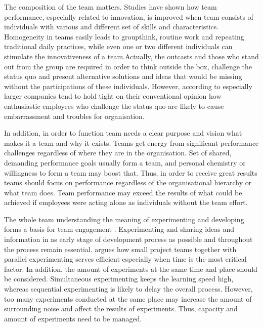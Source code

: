 The composition of the team matters. Studies have shown how team performance, especially related to innovation, is improved when team consists of individuals with various and different set of skills and characteristics\citep{buijs2007innovation}. Homogeneity in teams easily leads to groupthink, routine work and repeating traditional daily practices, while even one or two different individuals can stimulate the innovativeness of a team.Actually, the outcasts and those who stand out from the group are required in order to think outside the box, challenge the status quo and present alternative solutions and ideas that would be missing without the participations of these individuals. \citep{sternberg1997creativity} However, according to \citet{quinn1985managing} especially larger companies tend to hold tight on their conventional opinion how enthusiastic employees who challenge the status quo are likely to cause embarrassment and troubles for organisation.

In addition, in order to function team needs a clear purpose and vision what makes it a team and why it exists. Teams get energy from significant performance challenges regardless of where they are in the organisation. Set of shared, demanding performance goals usually form a team, and personal chemistry or willingness to form a team may boost that. Thus, in order to receive great results teams should focus on performance regardless of the organisational hierarchy or what team does. Team performance may exceed the results of what could be achieved if employees were acting alone as individuals without the team effort. \citep{katzenbach1993wisdom}

The whole team understanding the meaning of experimenting and developing forms a basis for team engagement . Experimenting and sharing ideas and information in as early stage of development process as possible and throughout the process remain essential. \citep{thomke2001enlightened} \citet{thomke2001enlightened} argues how small project teams together with parallel experimenting serves efficient especially when time is the most critical factor. In addition, the amount of experiments at the same time and place should be considered. Simultaneous experimenting keeps the learning speed high, whereas sequential experimenting is likely to delay the overall process. However, too many experiments conducted at the same place may increase the amount of surrounding noise and affect the results of experiments. Thus, capacity and amount of experiments need to be managed. \citep{thomke2003r}

